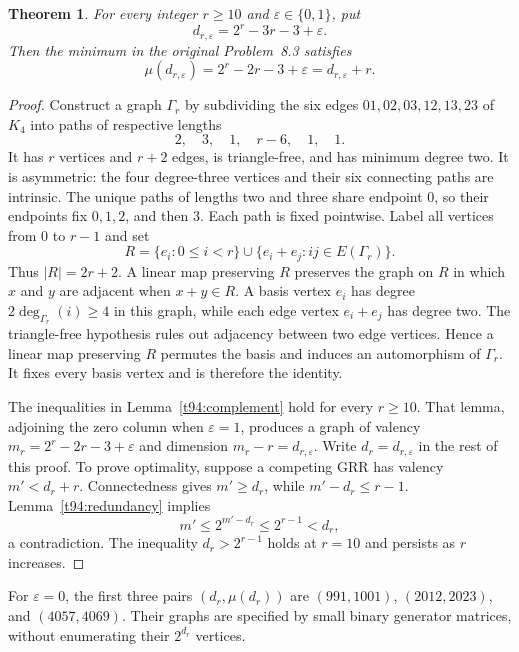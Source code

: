 \documentclass[11pt,a4paper]{article}
\newtheorem{theorem}{Theorem}[section]
\theoremstyle{definition}
\theoremstyle{remark}
\begin{document}
\begin{theorem}
\label{t94:exact}
For every integer $r\ge10$ and $\varepsilon\in\{0,1\}$, put
\[
 d_{r,\varepsilon}=2^r-3r-3+\varepsilon.
\]
Then the minimum in the original Problem~8.3 satisfies
\[
 \boxed{\mu(d_{r,\varepsilon})=2^r-2r-3+\varepsilon
 =d_{r,\varepsilon}+r.}
\]
\end{theorem}
\begin{proof}
Construct a graph $\Gamma_r$ by subdividing the six edges
$01,02,03,12,13,23$ of $K_4$ into paths of respective lengths
\[
 2,\quad3,\quad1,\quad r-6,\quad1,\quad1.
\]
It has $r$ vertices and $r+2$ edges, is triangle-free, and has minimum
degree two. It is asymmetric: the four degree-three vertices and their
six connecting paths are intrinsic. The unique paths of lengths two and
three share endpoint $0$, so their endpoints fix $0,1,2$, and then $3$.
Each path is fixed pointwise. Label all vertices from $0$ to $r-1$ and set
\[
 R=\{e_i:0\le i<r\}
 \cup\{e_i+e_j:ij\in E(\Gamma_r)\}.
\]
Thus $|R|=2r+2$. A linear map preserving $R$ preserves the graph on $R$
in which $x$ and $y$ are adjacent when $x+y\in R$. A basis vertex $e_i$
has degree $2\deg_{\Gamma_r}(i)\ge4$ in this graph, while each edge
vertex $e_i+e_j$ has degree two. The triangle-free hypothesis rules out
adjacency between two edge vertices. Hence a linear map preserving $R$
permutes the basis and induces an automorphism of $\Gamma_r$. It fixes
every basis vertex and is therefore the identity.

The inequalities in Lemma~\ref{t94:complement} hold for every $r\ge10$.
That lemma, adjoining the zero column when $\varepsilon=1$, produces a
graph of valency $m_r=2^r-2r-3+\varepsilon$ and dimension
$m_r-r=d_{r,\varepsilon}$. Write $d_r=d_{r,\varepsilon}$ in the rest
of this proof. To prove optimality, suppose a competing GRR has valency
$m'<d_r+r$. Connectedness gives $m'\ge d_r$, while
$m'-d_r\le r-1$. Lemma~\ref{t94:redundancy} implies
\[
 m'\le2^{m'-d_r}\le2^{r-1}<d_r,
\]
a contradiction. The inequality $d_r>2^{r-1}$ holds at $r=10$ and
persists as $r$ increases.
\end{proof}

For $\varepsilon=0$, the first three pairs $(d_r,\mu(d_r))$ are
$(991,1001)$, $(2012,2023)$, and $(4057,4069)$.
Their graphs are specified by small binary generator matrices, without
enumerating their $2^{d_r}$ vertices.
\end{document}
